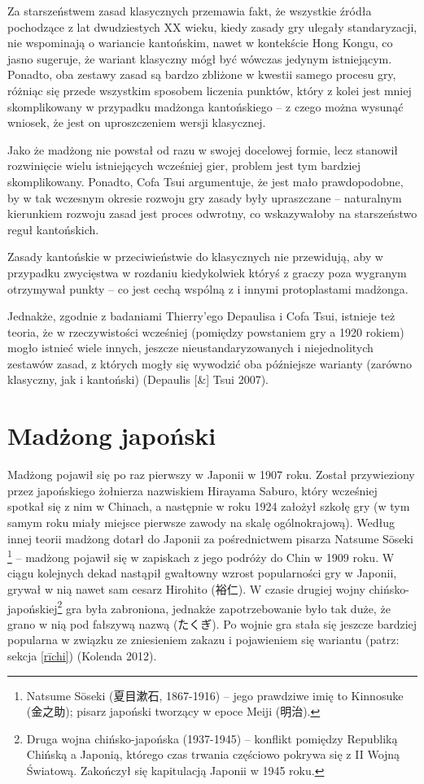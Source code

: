 Za starszeństwem zasad klasycznych przemawia fakt, że wszystkie źródła
pochodzące z lat dwudziestych XX wieku, kiedy zasady gry ulegały standaryzacji,
nie wspominają o wariancie kantońskim, nawet w kontekście Hong Kongu,
co jasno sugeruje, że wariant klasyczny mógł być wówczas jedynym istniejącym.
Ponadto, oba zestawy zasad są bardzo zbliżone w kwestii samego procesu gry,
różniąc się przede wszystkim sposobem liczenia punktów, który z kolei jest mniej
skomplikowany w przypadku madżonga kantońskiego -- z czego można wysunąć
wniosek, że jest on uproszczeniem wersji klasycznej.

Jako że madżong nie powstał od razu w swojej docelowej formie, lecz stanowił
rozwinięcie wielu istniejących wcześniej gier, problem jest tym bardziej
skomplikowany. Ponadto, Cofa Tsui argumentuje, że jest mało prawdopodobne, by w
tak wczesnym okresie rozwoju gry zasady były upraszczane -- naturalnym
kierunkiem rozwoju zasad jest proces odwrotny, co wskazywałoby na starszeństwo
reguł kantońskich.

Zasady kantońskie w przeciwieństwie do klasycznych nie przewidują, aby w
przypadku zwycięstwa w rozdaniu kiedykolwiek któryś z graczy poza wygranym
otrzymywał punkty -- co jest cechą wspólną z  i innymi
protoplastami madżonga. 

Jednakże, zgodnie z badaniami Thierry'ego Depaulisa i Cofa Tsui, istnieje też
teoria, że w rzeczywistości wcześniej (pomiędzy powstaniem gry a 1920 rokiem)
mogło istnieć wiele innych, jeszcze nieustandaryzowanych i niejednolitych
zestawów zasad, z których mogły się wywodzić oba późniejsze warianty (zarówno
klasyczny, jak i kantoński) (Depaulis [\&] Tsui 2007).

\section{Madżong japoński}
Madżong pojawił się po raz pierwszy w Japonii w 1907 roku. Został przywieziony
przez japońskiego żołnierza nazwiskiem Hirayama Saburo, który wcześniej spotkał
się z nim w Chinach, a następnie w roku 1924 założył szkołę gry (w tym samym
roku miały miejsce pierwsze zawody na skalę ogólnokrajową). Według innej teorii
madżong dotarł do Japonii za pośrednictwem pisarza Natsume Sōseki
\footnote{Natsume Sōseki (夏目漱石, 1867-1916) -- jego prawdziwe imię to Kinnosuke
(金之助); pisarz japoński tworzący w epoce Meiji (明治).} -- madżong pojawił się w
zapiskach z jego podróży do Chin w 1909 roku. W ciągu kolejnych dekad nastąpił
gwałtowny wzrost popularności gry w Japonii, grywał w nią nawet sam cesarz
Hirohito (裕仁). W czasie drugiej wojny chińsko-japońskiej\footnote{Druga wojna
chińsko-japońska (1937-1945) -- konflikt pomiędzy Republiką Chińską a Japonią,
którego czas trwania częściowo pokrywa się z II Wojną Światową. Zakończył się
kapitulacją Japonii w 1945 roku.} gra była zabroniona, jednakże zapotrzebowanie
było tak duże, że grano w nią pod fałszywą nazwą  (たくぎ). Po
wojnie gra stała się jeszcze bardziej popularna w związku ze zniesieniem zakazu
i pojawieniem się wariantu  (patrz: sekcja \ref{rīchi}) (Kolenda 
2012).

